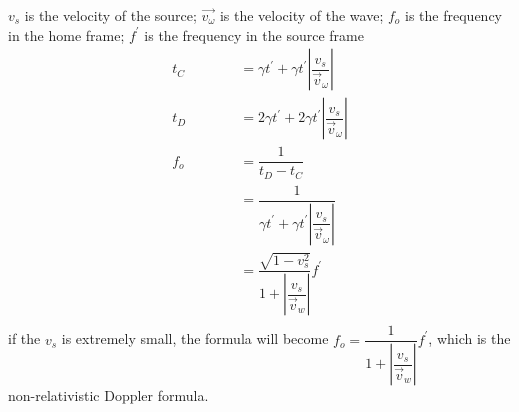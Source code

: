 \documentclass{article}
\theoremstyle{definition}
\theoremstyle{plain}
\begin{document}
\begin {enumerate}[itemindent=30pt,label=\bf Exercise {\arabic*}:]
\begin{figure}[h]
\begin{center}
\end{center}
\end{figure}
\subitem $v_{s}$ is the velocity of the source; $\vec{v_{\omega}}$ is the velocity of the wave; $f_{o}$ is the frequency in the home frame; $f^{'}$ is the frequency in the source frame
\begin{align*}
	t_{C} &= \gamma t^{'} + \gamma t^{'} |\dfrac{v_{s}}{\vec{v}_{\omega}}|\\
	t_{D} &= 2 \gamma t^{'} + 2 \gamma t^{'} |\dfrac{v_{s}}{\vec{v}_{\omega}}|\\ 
	f_{o} &= \dfrac{1}{t_{D} - t_{C}}\\
	\qquad\qquad &= \dfrac{1}{\gamma t^{'} + \gamma t^{'} |\dfrac{v_{s}}{\vec{v}_{\omega}}|}\\
	\qquad\qquad &= \dfrac{\sqrt{1-v_{s}^{2}}}{1+|\dfrac{v_{s}}{\vec{v}_{w}}|} f^{'}\\
\end{align*}
\subitem if the $v_{s}$ is extremely small, the formula will become $f_{o} = \dfrac{1}{1+|\dfrac{v_{s}}{\vec{v}_{w}}|} f^{'}$, which is the non-relativistic Doppler formula.
\end{enumerate}
\end{document}
